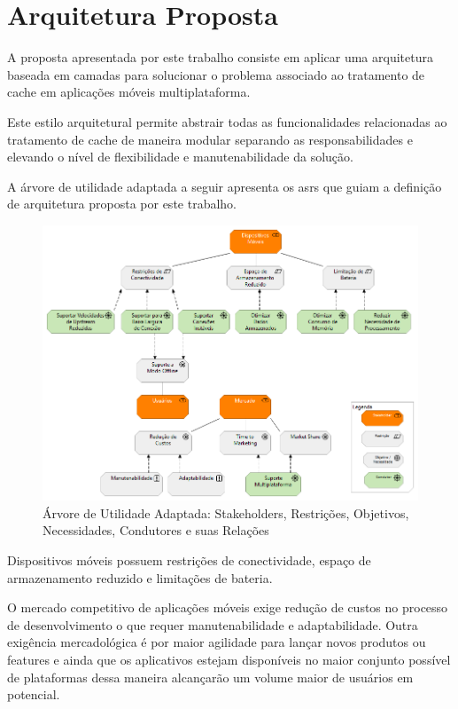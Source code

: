 \documentclass[
	article,			%
	11pt,				%
	oneside,			%
	a4paper,			%
	english,			%
	brazil,				%
	sumario=tradicional
]{abntex2}
\begin{document}
\chapter{Arquitetura Proposta}
A proposta apresentada por este trabalho consiste em aplicar uma arquitetura baseada em camadas para solucionar o problema associado ao tratamento de cache em aplicações móveis multiplataforma.

Este estilo arquitetural permite abstrair todas as funcionalidades relacionadas ao tratamento de cache de maneira modular separando as responsabilidades e elevando o nível de flexibilidade e manutenabilidade da solução.

A árvore de utilidade adaptada a seguir apresenta os \glspl{asr} que guiam a definição de arquitetura proposta por este trabalho.

\begin{figure}[H]
	\centering
	\includegraphics[scale=0.5]{images/UtilityTree}
	\caption{Árvore de Utilidade Adaptada: Stakeholders, Restrições, Objetivos, Necessidades, Condutores e suas Relações}
\end{figure}

Dispositivos móveis possuem restrições de conectividade, espaço de armazenamento reduzido e limitações de bateria.

O mercado competitivo de aplicações móveis exige redução de custos no processo de desenvolvimento o que requer manutenabilidade e adaptabilidade. Outra exigência mercadológica é por maior agilidade para lançar novos produtos ou features e ainda que os aplicativos estejam disponíveis no maior conjunto possível de plataformas dessa maneira alcançarão um volume maior de usuários em potencial.
\end{document}

